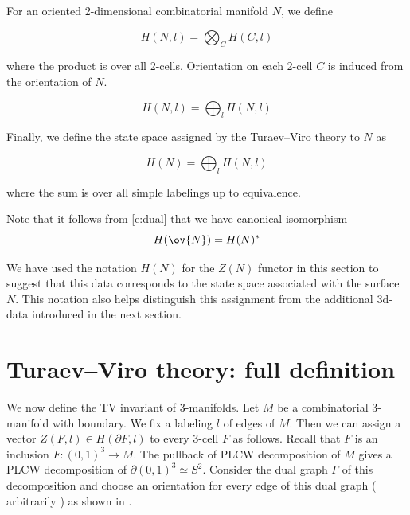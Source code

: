 For an oriented 2-dimensional combinatorial manifold $N$, we define

\begin{equation}
	H(N, l)= \bigotimes_{C} H(C, l)
\end{equation}

where the product is over all 2-cells. Orientation on each 2-cell $C$ is induced from the orientation of $N$.

\begin{equation}
	H(N,l)=\bigoplus_l H(N,l)
\end{equation}

Finally, we define the state space assigned by the Turaev--Viro theory to $N$ as

\begin{equation}\label{d:TV-surface}
	H(N)= \bigoplus_l H(N,l)
\end{equation}

where the sum is over all simple labelings up to equivalence.

Note that it follows from \eqref{e:dual} that we have canonical isomorphism
\begin{equation}\label{e:H-duality}
	H(\ov{N}) = H(N)^*
\end{equation}

 We have used the notation $H(N)$ for the $Z(N)$ functor in this section to suggest that this data corresponds to 
 the state space associated with the surface $N$. This notation also helps distinguish this assignment from the additional 
 3d-data introduced in the next section.

\section{Turaev--Viro theory: full definition}\label{s:tv-full-definition}
We now define the TV invariant of 3-manifolds. Let $M$ be a combinatorial 3-manifold with boundary. We fix a labeling $l$
 of edges of $M$. Then we can assign a vector $Z(F,l) \in H(\partial F, l)$ to  every 3-cell $F$ as follows. Recall that $F$ is an
  inclusion $F:(0,1)^3 \rightarrow M$. The pullback of PLCW decomposition of $M$ gives a PLCW decomposition of 
  $\partial (0,1)^3 \simeq S^2$. Consider the dual graph $\Gamma$ of this decomposition and choose an orientation for every 
  edge of this dual graph ( arbitrarily ) as shown in .

